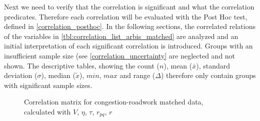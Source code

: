 Next we need to verify that the correlation is significant and what the correlation predicates. Therefore each correlation will be evaluated with the Post Hoc test, defined in \cref{correlation_posthoc}. In the following sections, the correlated relations of the variables in \cref{tbl:correlation_list_arbis_matched} are analyzed and an initial interpretation of each significant correlation is introduced. Groups with an insufficient sample size (see \cref{correlation_uncertainty} are neglected and not shown. The descriptive tables, showing the count ($n$), mean ($\bar{x}$), standard deviation ($\sigma$), median ($\tilde{x}$), $min$, $max$ and range ($\Delta$) therefore only contain groups with significant sample sizes.
\begin{figure}[!ht]
	\centering
	\caption{Correlation matrix for congestion-roadwork matched data, calculated with $V$, $\eta$, $\tau$, $r_{pq}$, $r$}
	\label{img:correlation_matrix_arbis_selected_effector_cramers}
\end{figure}

